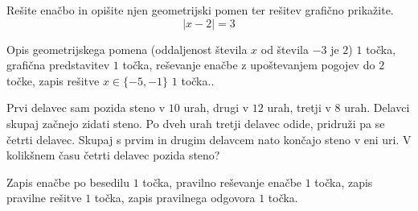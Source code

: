 \documentclass[addpoints]{exam}
\begin{document}
\begin{questions}
    \question[5]
    Rešite enačbo in opišite njen geometrijski pomen ter rešitev grafično prikažite.
    $$  \left\lvert x-2\right\rvert=3 $$
    
    
    \begin{solution}[7cm]
        Opis geometrijskega pomena (oddaljenost števila $x$ od števila $-3$ je $2$) $1$ točka, grafična predstavitev $1$ točka, reševanje enačbe z upoštevanjem pogojev do $2$ točke, zapis rešitve $x\in\{-5,-1\}$ $1$ točka..
    \end{solution}


    \newpage





    
    



    \question[5]
    Prvi delavec sam pozida steno v $10$ urah, drugi v $12$ urah, tretji v $8$ urah. Delavci
    skupaj začnejo zidati steno. Po dveh urah tretji delavec odide, pridruži pa se četrti delavec.
    Skupaj s prvim in drugim delavcem nato končajo steno v eni uri. V kolikšnem času četrti delavec
    pozida steno?
    
    
    \begin{solution}[13cm]
        Zapis enačbe po besedilu $1$ točka, pravilno reševanje enačbe $1$ točka, zapis pravilne rešitve $1$ točka, zapis pravilnega odgovora $1$ točka.
    \end{solution}






    



    

\end{questions}
\end{document}
